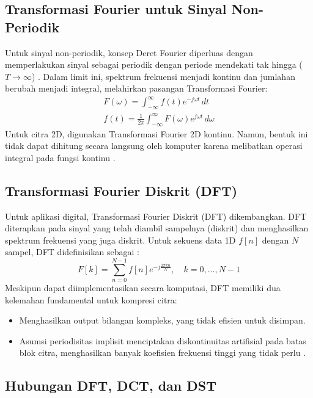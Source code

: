 \documentclass[a4paper]{article}
\begin{document}
\subsection{Transformasi Fourier untuk Sinyal Non-Periodik}
Untuk sinyal non-periodik, konsep Deret Fourier diperluas dengan memperlakukan sinyal sebagai periodik dengan periode mendekati tak hingga ($T \to \infty$) \cite{bracewell1999fourier}. Dalam limit ini, spektrum frekuensi menjadi kontinu dan jumlahan berubah menjadi integral, melahirkan pasangan Transformasi Fourier:
\begin{gather}
  F(\omega) = \int_{-\infty}^{\infty} f(t) e^{-j\omega t} \,dt \label{eq:ft_forward} \\
  f(t) = \frac{1}{2\pi} \int_{-\infty}^{\infty} F(\omega) e^{j\omega t} \,d\omega \label{eq:ft_inverse}
\end{gather}
Untuk citra 2D, digunakan Transformasi Fourier 2D kontinu. Namun, bentuk ini tidak dapat dihitung secara langsung oleh komputer karena melibatkan operasi integral pada fungsi kontinu \cite{oppenheim1996signals}.

\subsection{Transformasi Fourier Diskrit (DFT)}
Untuk aplikasi digital, Transformasi Fourier Diskrit (DFT) dikembangkan. DFT diterapkan pada sinyal yang telah diambil sampelnya (diskrit) dan menghasilkan spektrum frekuensi yang juga diskrit. Untuk sekuens data 1D $f[n]$ dengan $N$ sampel, DFT didefinisikan sebagai \cite{oppenheim1996signals}:
\begin{equation} \label{eq:dft_1d}
  F[k] = \sum_{n=0}^{N-1} f[n] e^{-j\frac{2\pi kn}{N}}, \quad k = 0, \dots, N-1
\end{equation}
Meskipun dapat diimplementasikan secara komputasi, DFT memiliki dua kelemahan fundamental untuk kompresi citra:
\begin{itemize}
  \item Menghasilkan output bilangan kompleks, yang tidak efisien untuk disimpan.
  \item Asumsi periodisitas implisit menciptakan diskontinuitas artifisial pada batas blok citra, menghasilkan banyak koefisien frekuensi tinggi yang tidak perlu \cite{ucsd_dct_notes}.
\end{itemize}

\subsection{Hubungan DFT, DCT, dan DST}
\end{document}
